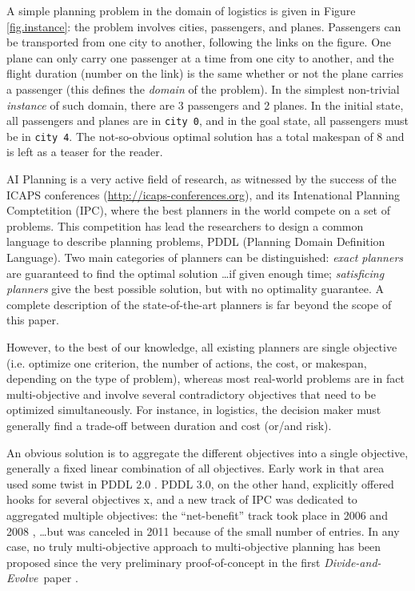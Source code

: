 \documentclass{llncs}
\def\dae{{\em Divide-and-Evolve}}
\begin{document}
A simple planning problem in the domain of logistics is given in Figure \ref{fig.instance}: the problem involves cities, passengers, and planes. Passengers can be transported from one city to another, following the links on the figure. One plane can only carry one passenger at a time from one city to another, and the flight duration (number on the link) is the same whether or not the plane carries a passenger (this defines the {\em domain} of the problem). In the simplest non-trivial {\em instance} of such domain, there are 3 passengers and 2 planes. In the initial state, all passengers and planes are in {\tt city 0}, and in the goal state, all passengers must be in {\tt city 4}. The not-so-obvious optimal solution has a total makespan of 8 and is left as a teaser for the reader.

AI Planning is a very active field of research, as witnessed by the success of the ICAPS conferences (\url{http://icaps-conferences.org}), and its Intenational Planning Comptetition (IPC), where the best planners in the world compete on a set of problems. This competition has lead the researchers to design a common language to describe planning problems, PDDL (Planning Domain Definition Language). Two main categories of planners can be distinguished: {\em exact planners} are guaranteed to find the optimal solution \ldots if given enough time; {\em satisficing planners} give the best possible solution, but with no optimality guarantee. A complete description of the state-of-the-art planners is far beyond the scope of this paper. 

However, to the best of our knowledge, all existing planners are single objective (i.e. optimize one criterion, the number of actions, the cost, or makespan, depending on the type of problem), whereas most real-world problems are in fact multi-objective and involve several contradictory objectives that need to be optimized simultaneously. For instance, in logistics, the decision maker must generally find a trade-off between duration and cost (or/and risk). 

An obvious solution is to aggregate the different objectives into a single objective, generally a fixed linear combination of all objectives. Early work in that area used some twist in PDDL 2.0 \cite{do2003sapa,refanidis2003multiobjective,gerevini2008}. PDDL 3.0, on the other hand, explicitly offered hooks for several objectives x, and a new track of IPC was dedicated to aggregated multiple objectives: the ``net-benefit'' track took place in 2006 \cite{chen2006temporal} and 2008 \cite{edelkamp2009optimal}, \ldots but was canceled in 2011 because of the small number of entries.
In any case, no truly multi-objective approach to multi-objective planning has been proposed since the very preliminary proof-of-concept in the first \dae\ paper \cite{Schoenauer2006}. 
\end{document}

